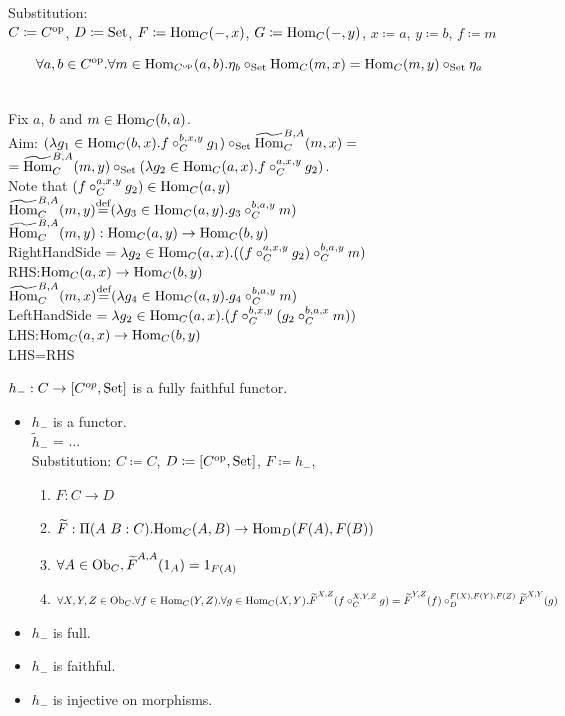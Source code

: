 \documentclass[10pt,a4paper]{article}
\begin{document}
Substitution:\\
$C \coloneqq C^{\textrm{op}}$, $D \coloneqq {\textrm{Set}}$, $F \coloneqq {\textrm{Hom}}_C(-,x)$, $G \coloneqq {\textrm{Hom}}_C(-,y)$, $x \coloneqq a$, $y \coloneqq b$, $f \coloneqq m$
\begin{lemma}
$$\forall a,b\in C^{\textrm{op}}. \forall m\in {\textrm{Hom}}_{C^{\textrm{op}}}(a,b).\eta_b \circ_{\textrm{Set}} {\textrm{Hom}}_C(m,x)={\textrm{Hom}}_C(m,y)\circ_{\textrm{Set}}\eta_a$$
\end{lemma}
\myprf\\
Fix $a$, $b$ and $m\in{\textrm{Hom}}_C(b,a)$.\\
Aim: $(\lambda g_1 \in {\textrm{Hom}}_C(b,x). f\circ^{b,x,y}_C g_1)\circ_{\textrm{Set}} {\widetilde{{\textrm{Hom}}}\textrm{}}_C^{B,A}(m,x) = $\\
$={\widetilde{{\textrm{Hom}}}\textrm{}}_C^{B,A}(m,y) \circ_{\textrm{Set}} (\lambda g_2 \in {\textrm{Hom}}_C(a,x). f\circ^{a,x,y}_C g_2)$.\\
Note that $(f\circ^{a,x,y}_C g_2) \in {\textrm{Hom}}_C(a,y)$\\
${\widetilde{{\textrm{Hom}}}\textrm{}}_C^{B,A}(m,y) {\stackrel{{\textrm{def}}}{=}} (\lambda g_3 \in {\textrm{Hom}}_C(a,y). g_3\circ^{b,a,y}_C m)$\\
${\widetilde{{\textrm{Hom}}}\textrm{}}_C^{B,A}(m,y) : {\textrm{Hom}}_C(a,y) \to {\textrm{Hom}}_C(b,y)$\\
RightHandSide $= \lambda g_2 \in {\textrm{Hom}}_C(a,x). ((f \circ_C^{a,x,y} g_2) \circ_C^{b,a,y} m )$\\
RHS:${\textrm{Hom}}_C(a,x) \to {\textrm{Hom}}_C(b,y)$\\
${\widetilde{{\textrm{Hom}}}\textrm{}}_C^{B,A}(m,x) {\stackrel{{\textrm{def}}}{=}} (\lambda g_4 \in {\textrm{Hom}}_C(a,y). g_4\circ^{b,a,y}_C m)$\\
LeftHandSide $= \lambda g_2 \in {\textrm{Hom}}_C(a,x). (f \circ_C^{b,x,y} (g_2 \circ_C^{b,a,x} m ))$\\
LHS:${\textrm{Hom}}_C(a,x) \to {\textrm{Hom}}_C(b,y)$\\
LHS=RHS\\
\myqed
\begin{lemma}
$h_{-}:C\rightarrow [C^{op},{\textrm{Set}}]$ is a fully faithful functor.
\end{lemma}
\myprf
\begin{itemize}
\item $h_-$ is a functor.\\
$\widetilde{h}_-$ = ...\\
Substitution: $C\coloneqq C$, $D\coloneqq [C^{\textrm{op}},{\textrm{Set}}]$, $F\coloneqq h_-$,
\begin{enumerate}
\item $F:C \to D$
\item ${\widetilde{F}\textrm{}}:\Pi(A\ B:C).{\textrm{Hom}}_C(A,B) \to {\textrm{Hom}}_D(F(A), F(B))$
\item $\forall A\in {\textrm{Ob}}_C, {\widetilde{F}\textrm{}}^{A,A}(1_A)=1_{F(A)}$
\item $\forall X,Y,Z \in {\textrm{Ob}}_C.\forall f\in{\textrm{Hom}}_C(Y,Z).\forall g\in{\textrm{Hom}}_C(X,Y). {\widetilde{F}\textrm{}}^{X,Z}(f\circ_C^{X,Y,Z} g)={\widetilde{F}\textrm{}}^{Y,Z}(f)\circ_D^{F(X),F(Y),F(Z)} {\widetilde{F}\textrm{}}^{X,Y}(g)$
\end{enumerate}
\item $h_-$ is full.
\item $h_-$ is faithful.
\item $h_-$ is injective on morphisms.
\end{itemize}
\end{document}
